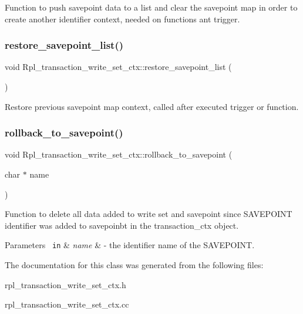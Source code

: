 Function to push savepoint data to a list and clear the savepoint map in order to create another identifier context, needed on functions ant trigger. \mbox{\label{classRpl__transaction__write__set__ctx_abab0107db18fb3f09c63fd4c458d6060}} 
\subsubsection{\texorpdfstring{restore\+\_\+savepoint\+\_\+list()}{restore\_savepoint\_list()}}
{\footnotesize\ttfamily void Rpl\+\_\+transaction\+\_\+write\+\_\+set\+\_\+ctx\+::restore\+\_\+savepoint\+\_\+list (\begin{DoxyParamCaption}{ }\end{DoxyParamCaption})}

Restore previous savepoint map context, called after executed trigger or function. \mbox{\label{classRpl__transaction__write__set__ctx_a6b1fa58962e012c29871668e207eae1f}} 
\subsubsection{\texorpdfstring{rollback\+\_\+to\+\_\+savepoint()}{rollback\_to\_savepoint()}}
{\footnotesize\ttfamily void Rpl\+\_\+transaction\+\_\+write\+\_\+set\+\_\+ctx\+::rollback\+\_\+to\+\_\+savepoint (\begin{DoxyParamCaption}\item[{char $\ast$}]{name }\end{DoxyParamCaption})}

Function to delete all data added to write set and savepoint since S\+A\+V\+E\+P\+O\+I\+NT identifier was added to savepoinbt in the transaction\+\_\+ctx object.


\begin{DoxyParams}[1]{Parameters}
\mbox{\texttt{ in}}  & {\em name} & -\/ the identifier name of the S\+A\+V\+E\+P\+O\+I\+NT. \\
\hline
\end{DoxyParams}


The documentation for this class was generated from the following files\+:\begin{DoxyCompactItemize}
\item 
rpl\+\_\+transaction\+\_\+write\+\_\+set\+\_\+ctx.\+h\item 
rpl\+\_\+transaction\+\_\+write\+\_\+set\+\_\+ctx.\+cc\end{DoxyCompactItemize}
